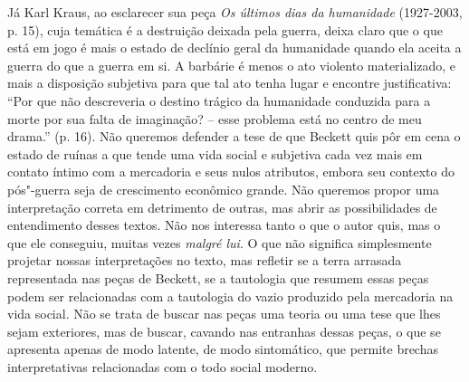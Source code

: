 {Já Karl Kraus, ao esclarecer sua peça \emph{Os últimos dias da
humanidade} (1927-2003, p. 15), cuja temática é a destruição deixada
pela guerra, deixa claro que o que está em jogo é mais o estado de
declínio geral da humanidade quando ela aceita a guerra do que a guerra
em si. A barbárie é menos o ato violento materializado, e mais a
disposição subjetiva para que tal ato tenha lugar e encontre
justificativa: ``Por que não descreveria o destino trágico da humanidade
conduzida para a morte por sua falta de imaginação? -- esse problema
está no centro de meu drama.'' (p. 16). Não queremos defender a tese de
que Beckett quis pôr em cena o estado de ruínas a que tende uma vida
social e subjetiva cada vez mais em contato íntimo com a mercadoria e
seus nulos atributos, embora seu contexto do pós"-guerra seja de
crescimento econômico grande. Não queremos propor uma interpretação
correta em detrimento de outras, mas abrir as possibilidades de
entendimento desses textos. Não nos interessa tanto o que o autor quis,
mas o que ele conseguiu, muitas vezes \emph{malgré lui}. O que não
significa simplesmente projetar nossas interpretações no texto, mas
refletir se a terra arrasada representada nas peças de Beckett, se a
tautologia que resumem essas peças podem ser relacionadas com a
tautologia do vazio produzido pela mercadoria na vida social. Não se
trata de buscar nas peças uma teoria ou uma tese que lhes sejam
exteriores, mas de buscar, cavando nas entranhas dessas peças, o que se
apresenta apenas de modo latente, de modo sintomático, que permite
brechas interpretativas relacionadas com o todo social moderno.

}

